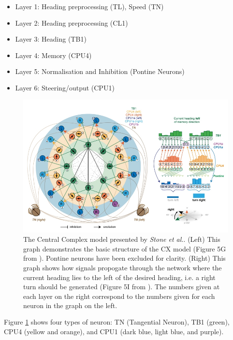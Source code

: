 \documentclass[a4paper,11pt,twoside,openright]{article}
\begin{document}
\begin{itemize}
\item{Layer 1: Heading preprocessing (TL), Speed (TN)}
\item{Layer 2: Heading preprocessing (CL1)}
\item{Layer 3: Heading (TB1)}
\item{Layer 4: Memory (CPU4)}
\item{Layer 5: Normalisation and Inhibition (Pontine Neurons)}
\item{Layer 6: Steering/output (CPU1)}
\end{itemize}

\begin{figure}[h!]
  \centering
  \includegraphics[width=\textwidth]{StoneCXModel}
  \caption{\label{fig:cx} The Central Complex model presented by
    \textit{Stone et al.}. (Left) This graph demonstrates the basic structure of
    the CX model (Figure 5G from \cite{Stone2017}). Pontine neurons have been
    excluded for clarity.
    (Right) This graph shows how signals propogate through the network where the
    current heading lies to the left of the desired heading, i.e. a right turn
    should be generated (Figure 5I from \cite{Stone2017}). The numbers given at
    each layer on the right correspond to the numbers given for each neuron
    in the graph on the left.
  }
\end{figure}

Figure \ref{fig:cx} shows four types of neuron: TN (Tangential Neuron), TB1
(green), CPU4 (yellow and orange), and CPU1 (dark blue, light blue, and purple).
\newline
\par
\end{document}
